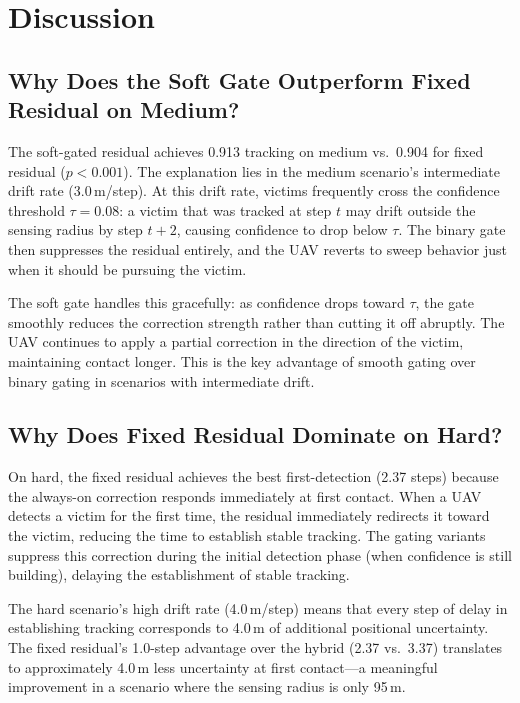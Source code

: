 \documentclass[journal]{IEEEtran}
\begin{document}
\section{Discussion}
\label{sec:discussion}

\subsection{Why Does the Soft Gate Outperform Fixed Residual on Medium?}

The soft-gated residual achieves 0.913 tracking on medium vs.\ 0.904 for fixed
residual ($p < 0.001$). The explanation lies in the medium scenario's intermediate
drift rate (3.0\,m/step). At this drift rate, victims frequently cross the confidence
threshold $\tau = 0.08$: a victim that was tracked at step $t$ may drift outside the
sensing radius by step $t{+}2$, causing confidence to drop below $\tau$. The binary
gate then suppresses the residual entirely, and the UAV reverts to sweep behavior
just when it should be pursuing the victim.

The soft gate handles this gracefully: as confidence drops toward $\tau$, the gate
smoothly reduces the correction strength rather than cutting it off abruptly. The UAV
continues to apply a partial correction in the direction of the victim, maintaining
contact longer. This is the key advantage of smooth gating over binary gating in
scenarios with intermediate drift.

\subsection{Why Does Fixed Residual Dominate on Hard?}

On hard, the fixed residual achieves the best first-detection (2.37 steps) because
the always-on correction responds immediately at first contact. When a UAV detects a
victim for the first time, the residual immediately redirects it toward the victim,
reducing the time to establish stable tracking. The gating variants suppress this
correction during the initial detection phase (when confidence is still building),
delaying the establishment of stable tracking.

The hard scenario's high drift rate (4.0\,m/step) means that every step of delay
in establishing tracking corresponds to 4.0\,m of additional positional uncertainty.
The fixed residual's 1.0-step advantage over the hybrid (2.37 vs.\ 3.37) translates
to approximately 4.0\,m less uncertainty at first contact---a meaningful improvement
in a scenario where the sensing radius is only 95\,m.
\end{document}
